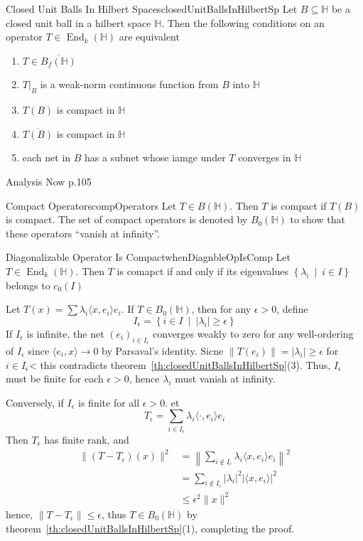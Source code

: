 \documentclass[oneside]{book}
\renewcommand{\H}{\mathbb{H}}
\newcommand{\sse}{\subseteq}
\newcommand{\oln}{\overline}
\newcommand{\End}{\operatorname{End}}
\newcommand{\set}[2]{\left\{#1 \ \middle|\ #2\right\}}
\begin{document}
\begin{thm}{Closed Unit Balls In Hilbert Spaces}{closedUnitBallsInHilbertSp}
	Let $B \sse \H$ be a closed unit ball in a hilbert space $\H$. Then the following conditions on an operator
	$T \in \End_k(\H)$ are equivalent
	\begin{enumerate}
		\item $T \in \oln{B_f(\H)}$
		\item $T|_{B}$ is a weak-norm continuous function from $B$ into $\H$
		\item $T(B)$ is compact in $\H$
			\item $\oln{T(B)}$ is compact in $\H$
		\item each net in $B$ has a subnet whose iamge under $T$ converges in $\H$
	\end{enumerate}

\end{thm}

\begin{Proof}
	Analysis Now p.105
\end{Proof}

\begin{defn}{Compact Operators}{compOperators}
	Let $T \in B(\H)$. Then $T$ is compact if $T(B)$ is compact. The set of compact operators is denoted by
	$B_0(\H)$ to show that these operators ``vanish at infinity''.
\end{defn}

\begin{lem}{Diagonalizable Operator Is Compact}{whenDiagnbleOpIsComp}
	Let $T \in \End_k(\H)$. Then $T$ is comapct if and only if its eigenvalues $\set{\lambda_i}{i \in I}$ belongs
	to $c_0(I)$
\end{lem}

\begin{Proof}
Let $T(x) = \sum \lambda_i \langle x, e_i \rangle e_i$. If $T \in B_0(\H)$, then for any $\epsilon > 0$,
	define
	\[
		I_\epsilon = \set{i \in I}{|\lambda_i| \ge \epsilon}
	\]
	If $I_\epsilon$ is infinite, the net $(e_i)_{i \in I_\epsilon}$ converges weakly to zero for any
	well-ordering of $I_\epsilon$ since $ \langle e_i, x \rangle \to 0$ by Parsaval's identity. Sicne $\|T(e_i)\|
	= |\lambda_i| \ge \epsilon$ for $i \in I_\epsilon$< this contradicts
	theorem~\ref{th:closedUnitBallsInHilbertSp}(3). Thus, $I_\epsilon$ must be finite for each $\epsilon
	> 0$, hence $\lambda_i$ must vanish at infinity.

	Conversely, if $I_\epsilon$ is finite for all $\epsilon > 0$.
	et
	\[
		T_\epsilon = \sum_{i \in I_\epsilon} \lambda_i \langle \cdot, e_i \rangle e_i
	\]
	Then $T_\epsilon$ has finite rank, and
	\begin{align*}
		\|(T-  T_\epsilon)(x)\|^2 &= \left\| \sum_{i \notin I_\epsilon} \lambda_i \langle x, e_i \rangle
		e_i\right\|^2\\
								  &= \sum_{i \notin I_\epsilon} |\lambda_i|^2
								  | \langle x, e_i \rangle|^2\\
								  &\le \epsilon^2 \|x\|^2
	\end{align*}
	hence, $\|T - T_\epsilon\| \le \epsilon$, thus $T \in B_0(\H)$ by
	theorem~\ref{th:closedUnitBallsInHilbertSp}(1), completing the proof.
\end{Proof}
\end{document}
